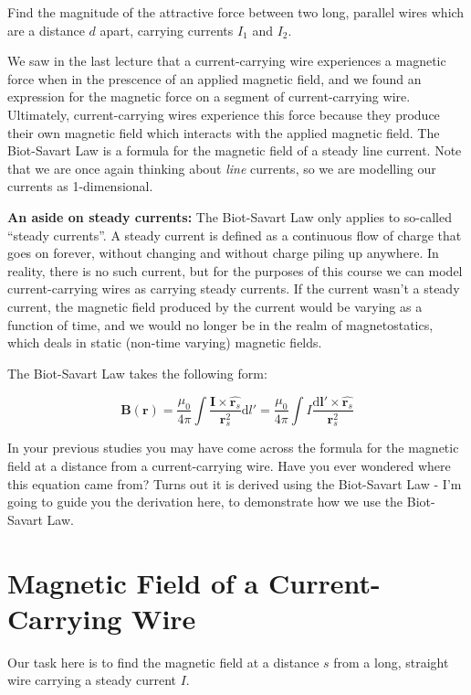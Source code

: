 \documentclass[
  letterpaper,
  DIV=11,
  numbers=noendperiod]{scrreprt}
\begin{document}
Find the magnitude of the attractive force between two long, parallel
wires which are a distance \(d\) apart, carrying currents \(I_1\) and
\(I_2\).

We saw in the last lecture that a current-carrying wire experiences a
magnetic force when in the prescence of an applied magnetic field, and
we found an expression for the magnetic force on a segment of
current-carrying wire. Ultimately, current-carrying wires experience
this force because they produce their own magnetic field which interacts
with the applied magnetic field. The Biot-Savart Law is a formula for
the magnetic field of a steady line current. Note that we are once again
thinking about \emph{line} currents, so we are modelling our currents as
1-dimensional.

\textbf{An aside on steady currents:} The Biot-Savart Law only applies
to so-called ``steady currents''. A steady current is defined as a
continuous flow of charge that goes on forever, without changing and
without charge piling up anywhere. In reality, there is no such current,
but for the purposes of this course we can model current-carrying wires
as carrying steady currents. If the current wasn't a steady current, the
magnetic field produced by the current would be varying as a function of
time, and we would no longer be in the realm of magnetostatics, which
deals in static (non-time varying) magnetic fields.

The Biot-Savart Law takes the following form:

\[\mathrm{\mathbf{B}}(\mathrm{\mathbf{r}}) = \frac{\mu_0}{4\pi} \int \frac{\mathrm{\mathbf{I}}\times \hat{\mathrm{\mathbf{r}}_s} }{\mathrm{\mathbf{r}}_s^2} \mathrm{d}l' =  \frac{\mu_0}{4\pi} \int I \frac{\mathrm{d} \mathrm{\mathbf{l}}' \times \hat{\mathrm{\mathbf{r}}_s} }{\mathrm{\mathbf{r}}_s^2} \]

In your previous studies you may have come across the formula for the
magnetic field at a distance from a current-carrying wire. Have you ever
wondered where this equation came from? Turns out it is derived using
the Biot-Savart Law - I'm going to guide you the derivation here, to
demonstrate how we use the Biot-Savart Law.

\section{Magnetic Field of a Current-Carrying
Wire}\label{magnetic-field-of-a-current-carrying-wire}

Our task here is to find the magnetic field at a distance \(s\) from a
long, straight wire carrying a steady current \(I\).
\end{document}
